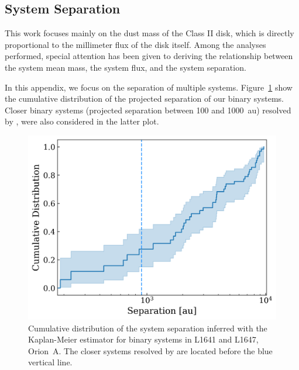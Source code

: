 \documentclass{aa}
\begin{document}
\begin{appendix} %

\FloatBarrier
\twocolumn
\section{System Separation} \label{appendixA}

This work focuses mainly on the dust mass of the Class II disk, which is directly proportional to the millimeter flux of the disk itself. Among the analyses performed, special attention has been given to deriving the relationship between the system mean mass, the system flux, and the system separation. \par
In this appendix, we focus on the separation of multiple systems. Figure~\ref{figure:sepcumulative} show the cumulative distribution of the projected separation of our binary systems. Closer binary systems (projected separation between 100 and 1000~au) resolved by \cite{Kounkel16}, were also considered in the latter plot. 

\begin{figure}[hbt!]
\centering
   \includegraphics[width=\columnwidth]{Multiple_vs_Separation_SodVisKoun.png}
     \caption{Cumulative distribution of the system separation inferred with the Kaplan-Meier estimator for binary systems in L1641 and L1647, Orion~A. The closer systems resolved by \cite{Kounkel16} are located before the blue vertical line.}
     \label{figure:sepcumulative}
\end{figure}


\end{appendix}
\end{document}
